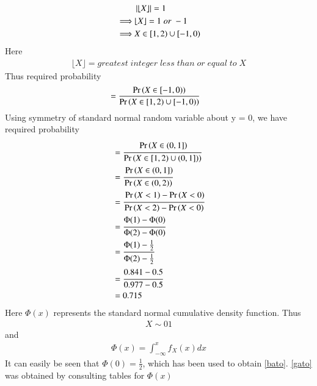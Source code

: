 
\begin{align}
    &\left\vert\lfloor X\rfloor\right\vert = 1\\
    \implies &\lfloor X\rfloor = 1\; or\; -1\\
    \implies &X \in [1, 2) \cup [-1, 0)
\end{align}
Here 
\begin{align*}
    \lfloor X\rfloor = greatest\; integer\; less\; than\; or\; equal\; to\; X
\end{align*}
Thus required probability
\begin{align}
    &= \frac{\Pr\left(X\in [-1,0)\right)}{\Pr\left(X \in [1, 2) \cup [-1, 0)\right)}
\end{align} 
Using symmetry of standard normal random variable about y = 0, we have required probability 
\begin{align}
    &= \cfrac{\Pr\left(X\in (0,1]\right)}{\Pr\left(X \in [1, 2) \cup (0, 1])\right)}\\
    &= \cfrac{\Pr\left(X \in (0, 1]\right)}{\Pr\left(X \in (0, 2)\right)}\\
    &= \cfrac{\Pr\left(X < 1\right) - \Pr\left(X < 0\right)}{\Pr\left(X < 2\right) - \Pr\left(X < 0\right)}\\
    &= \cfrac{\Phi(1) - \Phi(0)}{\Phi(2) - \Phi(0)}\\
    &= \cfrac{\Phi(1) - \frac{1}{2}}{\Phi(2) - \frac{1}{2}}\label{bato}\\
    &= \cfrac{0.841 - 0.5}{0.977 - 0.5}\label{gato}\\
    &= 0.715
\end{align}
Here $\Phi(x)$ represents the standard normal cumulative density function. Thus 
\begin{align}
    X \sim \mathcal{0}{1}
\end{align}
and 
\begin{align}
    \Phi(x) = \int_{-\infty}^x f_X(x)dx
\end{align}
It can easily be seen that $\Phi(0) = \frac{1}{2}$, which has been used to obtain \eqref{bato}.
\eqref{gato} was obtained by consulting tables for $\Phi(x)$